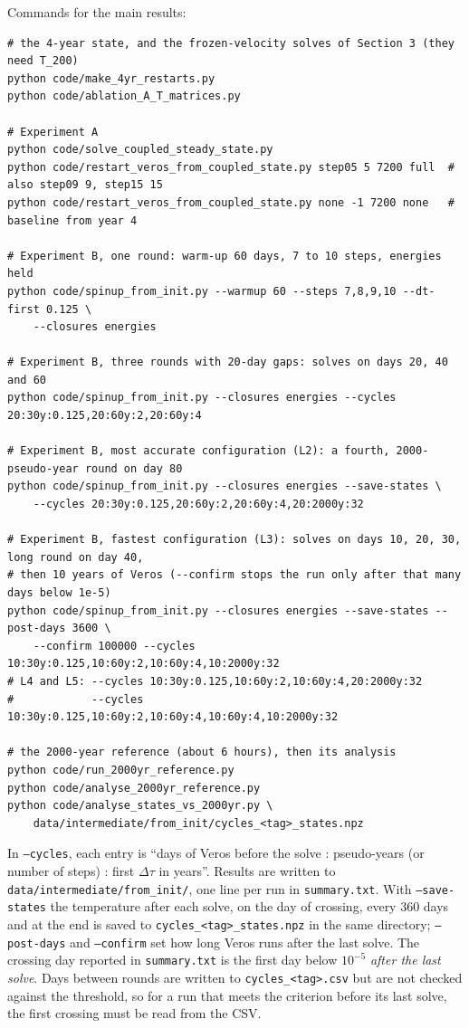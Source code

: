 \documentclass{article}
\begin{document}
Commands for the main results:
\begin{verbatim}
# the 4-year state, and the frozen-velocity solves of Section 3 (they need T_200)
python code/make_4yr_restarts.py
python code/ablation_A_T_matrices.py

# Experiment A
python code/solve_coupled_steady_state.py
python code/restart_veros_from_coupled_state.py step05 5 7200 full  # also step09 9, step15 15
python code/restart_veros_from_coupled_state.py none -1 7200 none   # baseline from year 4

# Experiment B, one round: warm-up 60 days, 7 to 10 steps, energies held
python code/spinup_from_init.py --warmup 60 --steps 7,8,9,10 --dt-first 0.125 \
    --closures energies

# Experiment B, three rounds with 20-day gaps: solves on days 20, 40 and 60
python code/spinup_from_init.py --closures energies --cycles 20:30y:0.125,20:60y:2,20:60y:4

# Experiment B, most accurate configuration (L2): a fourth, 2000-pseudo-year round on day 80
python code/spinup_from_init.py --closures energies --save-states \
    --cycles 20:30y:0.125,20:60y:2,20:60y:4,20:2000y:32

# Experiment B, fastest configuration (L3): solves on days 10, 20, 30, long round on day 40,
# then 10 years of Veros (--confirm stops the run only after that many days below 1e-5)
python code/spinup_from_init.py --closures energies --save-states --post-days 3600 \
    --confirm 100000 --cycles 10:30y:0.125,10:60y:2,10:60y:4,10:2000y:32
# L4 and L5: --cycles 10:30y:0.125,10:60y:2,10:60y:4,20:2000y:32
#            --cycles 10:30y:0.125,10:60y:2,10:60y:4,10:60y:4,10:2000y:32

# the 2000-year reference (about 6 hours), then its analysis
python code/run_2000yr_reference.py
python code/analyse_2000yr_reference.py
python code/analyse_states_vs_2000yr.py \
    data/intermediate/from_init/cycles_<tag>_states.npz
\end{verbatim}

In \texttt{--cycles}, each entry is ``days of Veros before the solve : pseudo-years (or number of steps) : first $\Delta\tau$ in years''. Results are written to \texttt{data/intermediate/from\_init/}, one line per run in \texttt{summary.txt}. With \texttt{--save-states} the temperature after each solve, on the day of crossing, every 360 days and at the end is saved to \texttt{cycles\_<tag>\_states.npz} in the same directory; \texttt{--post-days} and \texttt{--confirm} set how long Veros runs after the last solve. The crossing day reported in \texttt{summary.txt} is the first day below $10^{-5}$ \emph{after the last solve}. Days between rounds are written to \texttt{cycles\_<tag>.csv} but are not checked against the threshold, so for a run that meets the criterion before its last solve, the first crossing must be read from the CSV.
\end{document}
